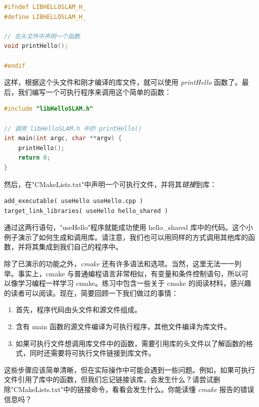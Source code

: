 \begin{lstlisting}[language=c++,caption=slambook2/ch2/libHelloSLAM.h]
#ifndef LIBHELLOSLAM_H_
#define LIBHELLOSLAM_H_

// 在头文件中声明一个函数
void printHello();

#endif
\end{lstlisting}

这样，根据这个头文件和刚才编译的库文件，就可以使用 \textit{printHello} 函数了。最后，我们编写一个可执行程序来调用这个简单的函数：

\begin{lstlisting}[language=c++,caption=slambook2/ch2/useHello.cpp]
#include "libHelloSLAM.h"

// 调用 libHelloSLAM.h 中的 printHello()
int main(int argc, char **argv) {
    printHello();
    return 0;
}
\end{lstlisting}

然后，在"CMakeLists.txt"中声明一个可执行文件，并将其\textit{链接}到库：
\begin{lstlisting}[caption=slambook2/ch2/CMakeLists.txt]
add_executable( useHello useHello.cpp )
target_link_libraries( useHello hello_shared )
\end{lstlisting}

通过这两行语句，"useHello"程序就能成功使用 hello\_shared 库中的代码。这个小例子演示了如何生成和调用库。请注意，我们也可以用同样的方式调用其他库的函数，并将其集成到我们自己的程序中。

除了已演示的功能之外，\textit{cmake} 还有许多语法和选项。当然，这里无法一一列举。事实上，cmake 与普通编程语言非常相似，有变量和条件控制语句，所以可以像学习编程一样学习 cmake。练习中包含一些关于 cmake 的阅读材料，感兴趣的读者可以阅读。现在，简要回顾一下我们做过的事情：

\begin{enumerate}
    \item 首先，程序代码由头文件和源文件组成。
    \item 含有 main 函数的源文件编译为可执行程序，其他文件编译为库文件。
    \item 如果可执行文件想调用库文件中的函数，需要引用库的头文件以了解函数的格式，同时还需要将可执行文件链接到库文件。
\end{enumerate}

这些步骤应该简单清晰，但在实际操作中可能会遇到一些问题。例如，如果可执行文件引用了库中的函数，但我们忘记链接该库，会发生什么？请尝试删除"CMakeLists.txt"中的链接命令，看看会发生什么。你能读懂 \textit{cmake} 报告的错误信息吗？


